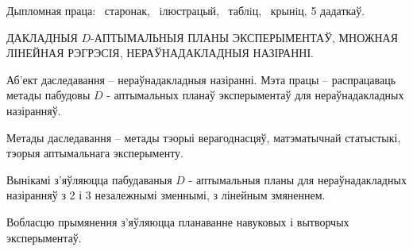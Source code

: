 Дыпломная праца: \ старонак, \totalfigures{}~iлюстрацый, \totaltables{}~таблiц,
\ крынiц, 5 дадаткаў.


\vspace{\baselineskip}

ДАКЛАДНЫЯ $D$-АПТЫМАЛЬНЫЯ ПЛАНЫ ЭКСПЕРЫМЕНТАЎ, МНОЖНАЯ ЛІНЕЙНАЯ РЭГРЭСІЯ, НЕРАЎНАДАКЛАДНЫЯ НАЗІРАННІ.

\vspace{\baselineskip}

Аб'ект даследавання -- нераўнадакладныя назіранні. Мэта працы -- распрацаваць метады пабудовы $D$ - аптымальных планаў эксперыментаў для нераўнадакладных назіранняў.

Метады даследавання -- метады тэорыі верагоднасцяў, матэматычнай
статыстыкі, тэорыя аптымальнага эксперыменту.

Вынікамі з'яўляюцца пабудаваныя $D$ - аптымальныя планы для нераўнадакладных назіранняў з 2 і 3 незалежнымі зменнымі, з лінейным змяненнем.

Вобласцю прымянення з'яўляюцца планаванне навуковых і вытворчых эксперыментаў.
